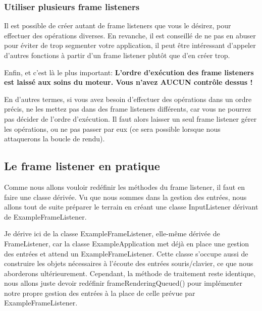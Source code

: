 \documentclass[10pt,a4paper]{report}
\begin{document}
\subsubsection{Utiliser plusieurs frame listeners}

Il est possible de cr\'eer autant de frame listeners que vous le d\'esirez, pour effectuer des op\'erations diverses. En revanche, il est conseill\'e de ne pas en abuser pour \'eviter de trop segmenter votre application, il peut \^etre int\'eressant d'appeler d'autres fonctions \`{a} partir d'un frame listener plut\^ot que d'en cr\'eer trop.

Enfin, et c'est l\`{a} le plus important:
\textbf{L'ordre d'ex\'ecution des frame listeners est laiss\'e aux soins du moteur. Vous n'avez AUCUN contr\^ole dessus !}

En d'autres termes, si vous avez besoin d'effectuer des op\'erations dans un ordre pr\'ecis, ne les mettez pas dans des frame listeners diff\'erents, car vous ne pourrez pas d\'ecider de l'ordre d'ex\'ecution. Il faut alors laisser un seul frame listener g\'erer les op\'erations, ou ne pas passer par eux (ce sera possible lorsque nous attaquerons la boucle de rendu).



\subsection{Le frame listener en pratique}

Comme nous allons vouloir red\'efinir les m\'ethodes du frame listener, il faut en faire une classe d\'eriv\'ee. Vu que nous sommes dans la gestion des entr\'ees, nous allons tout de suite pr\'eparer le terrain en cr\'eant une classe InputListener d\'erivant de ExampleFrameListener.

Je d\'erive ici de la classe ExampleFrameListener, elle-m\^eme d\'eriv\'ee de FrameListener, car la classe ExampleApplication met d\'ej\`{a} en place une gestion des entr\'ees et attend un ExampleFrameListener. Cette classe s'occupe aussi de construire les objets n\'ecessaires \`{a} l'\'ecoute des entr\'ees souris/clavier, ce que nous aborderons ult\'erieurement.
Cependant, la m\'ethode de traitement reste identique, nous allons juste devoir red\'efinir frameRenderingQueued() pour impl\'ementer notre propre gestion des entr\'ees \`{a} la place de celle pr\'evue par ExampleFrameListener.
\end{document}
